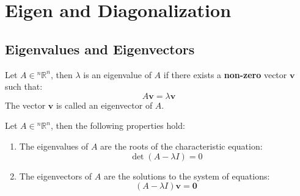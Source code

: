 \documentclass[11pt]{article}
\begin{document}
\section{Eigen and Diagonalization}
\subsection{Eigenvalues and Eigenvectors}
\begin{definition}
    Let $A \in {^n\mathbb{R}^n}$, then $\lambda$ is an eigenvalue of $A$ if there exists a \textbf{non-zero} vector $\textbf{v}$ such that:
    \begin{equation}
        A\textbf{v} = \lambda \textbf{v}
    \end{equation}
    The vector $\textbf{v}$ is called an eigenvector of $A$.
\end{definition}
\begin{theorem}
    Let $A \in {^n\mathbb{R}^n}$, then the following properties hold:
    \begin{enumerate}
        \item The eigenvalues of $A$ are the roots of the characteristic equation:
        \begin{equation}
            \det(A - \lambda I) = 0
        \end{equation}
        \item The eigenvectors of $A$ are the solutions to the system of equations:
        \begin{equation}
            (A - \lambda I)\textbf{v} = \textbf{0}
        \end{equation}
    \end{enumerate}
\end{theorem}
\end{document}
